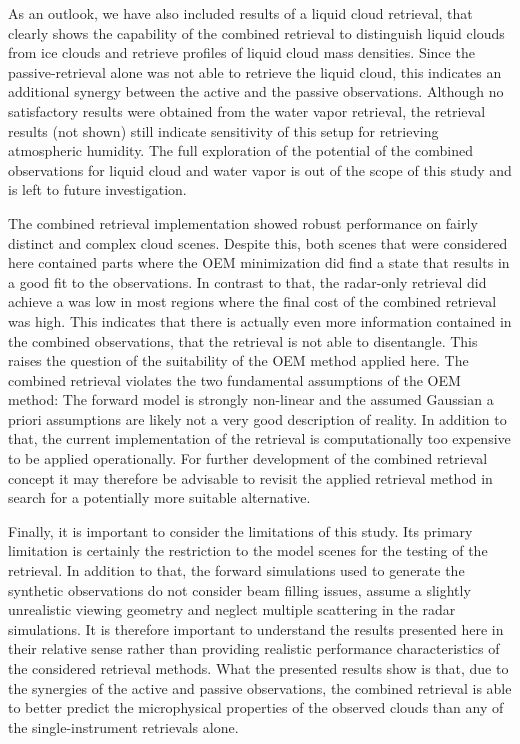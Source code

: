 \documentclass[journal abbreviation, manuscript]{copernicus}
\begin{document}
As an outlook, we have also included results of a liquid cloud retrieval, that
clearly shows the capability of the combined retrieval to distinguish liquid
clouds from ice clouds and retrieve profiles of liquid cloud mass densities.
Since the passive-retrieval alone was not able to retrieve the liquid cloud,
this indicates an additional synergy between the active and the passive
observations. Although no satisfactory results were obtained from the water
vapor retrieval, the retrieval results (not shown) still indicate sensitivity of
this setup for retrieving atmospheric humidity. The full exploration of the
potential of the combined observations for liquid cloud and water vapor is out
of the scope of this study and is left to future investigation.

The combined retrieval implementation showed robust performance on fairly
distinct and complex cloud scenes. Despite this, both scenes that were
considered here contained parts where the OEM minimization did find a state that
results in a good fit to the observations. In contrast to that, the radar-only
retrieval did achieve a was low in most regions where the final cost of the
combined retrieval was high. This indicates that there is actually even more
information contained in the combined observations, that the retrieval is not
able to disentangle. This raises the question of the suitability of the OEM
method applied here. The combined retrieval violates the two fundamental
assumptions of the OEM method: The forward model is strongly non-linear and the
assumed Gaussian a priori assumptions are likely not a very good description of
reality. In addition to that, the current implementation of the retrieval is
computationally too expensive to be applied operationally. For further
development of the combined retrieval concept it may therefore be advisable to
revisit the applied retrieval method in search for a potentially more suitable
alternative.

Finally, it is important to consider the limitations of this study. Its primary
limitation is certainly the restriction to the model scenes for the testing of
the retrieval. In addition to that, the forward simulations used to generate the
synthetic observations do not consider beam filling issues, assume a slightly
unrealistic viewing geometry and neglect multiple scattering in the radar
simulations. It is therefore important to understand the results presented here
in their relative sense rather than providing realistic performance
characteristics of the considered retrieval methods. What the presented results
show is that, due to the synergies of the active and passive observations, the
combined retrieval is able to better predict the microphysical properties of the
observed clouds than any of the single-instrument retrievals alone.
\end{document}
